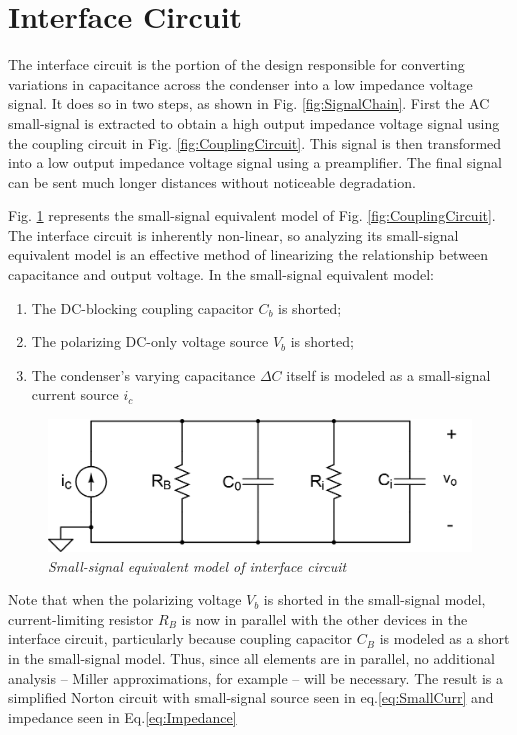 \documentclass[journal]{IEEEtran}
\begin{document}
\section{Interface Circuit}

The interface circuit is the portion of the design responsible for converting variations in capacitance across the condenser into a low impedance voltage signal. It does so in two steps, as shown in Fig. \ref{fig:SignalChain}. First the AC small-signal is extracted to obtain a high output impedance voltage signal using the coupling circuit in Fig. \ref{fig:CouplingCircuit}. This signal is then transformed into a low output impedance voltage signal using a preamplifier. The final signal can be sent much longer distances without noticeable degradation.\supercite{bruel}

Fig. \ref{fig:SmallSig} represents the small-signal equivalent model of Fig. \ref{fig:CouplingCircuit}. The interface circuit is inherently non-linear, so analyzing its small-signal equivalent model is an effective method of linearizing the relationship between capacitance and output voltage. In the small-signal equivalent model:

\begin{enumerate}
	\item The DC-blocking coupling capacitor $C_b$ is shorted; 
	\item The polarizing DC-only voltage source $V_b$ is shorted;
	\item The condenser's varying capacitance $\Delta C$ itself is modeled as a small-signal current source $i_c$
\end{enumerate}

\begin{figure}[ht]
	\centering
	\includegraphics[scale=0.2]{smallSig.png}
	\caption{\em Small-signal equivalent model of interface circuit}
	\label{fig:SmallSig}
\end{figure}

Note that when the polarizing voltage $V_b$ is shorted in the small-signal model, current-limiting resistor $R_B$ is now in parallel with the other devices in the interface circuit, particularly because coupling capacitor $C_B$ is modeled as a short in the small-signal model. Thus, since all elements are in parallel, no additional analysis – Miller approximations, for example – will be necessary. The result is a simplified Norton circuit with small-signal source seen in eq.\ref{eq:SmallCurr} and impedance seen in Eq.\ref{eq:Impedance} 
\end{document}
